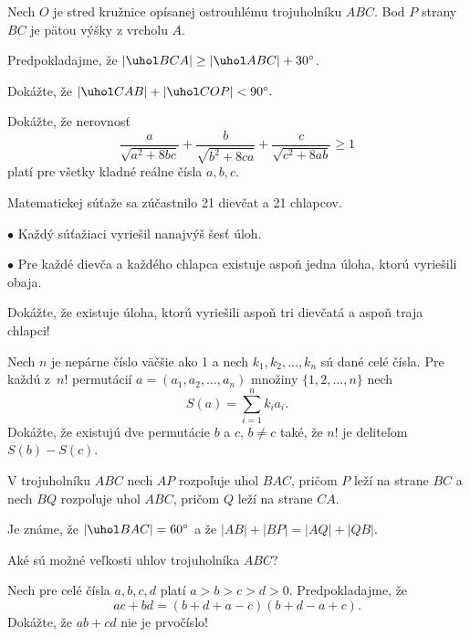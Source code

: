 {%
Nech $O$ je stred  kružnice opísanej ostrouhlému
trojuholníku $ABC$. Bod $P$ strany $BC$ je pätou
výšky z vrcholu $A$.

Predpokladajme, že $|\uhol BCA| \geq
|\uhol ABC| + 30^{\circ}$.

Dokážte, že  $|\uhol CAB| + |\uhol COP| < 90^{\circ}.$}

{%
Dokážte, že nerovnosť
$$
\frac{a}{\sqrt{a^2+8bc}} + \frac{b}{\sqrt{b^2+8ca}} + \frac{c}{\sqrt{c^2+8ab}}
\geq 1
$$
platí pre  všetky  kladné reálne čísla $a,
b, c$.}

{%
Matematickej súťaže sa zúčastnilo 21 dievčat a
21 chlapcov.
\item{$\bullet$}
Každý súťažiaci vyriešil nanajvýš
šesť úloh.
\item{$\bullet$}
Pre každé dievča a každého chlapca existuje
aspoň jedna úloha, ktorú vyriešili obaja.

\noindent
Dokážte, že existuje úloha, ktorú vyriešili
aspoň tri dievčatá a aspoň traja chlapci!}

{%
Nech $n$ je nepárne číslo väčšie ako 1
a nech $k_1, k_2, \dots, k_n$ sú dané celé čísla.
Pre každú z~$n!$ permutácií $a=(a_1, a_2,\dots, a_n)$
množiny $\{1, 2, \dots, n\}$ nech
$$
S(a) = \sum_{i=1}^n k_i a_i.
$$
Dokážte, že existujú dve permutácie $b$ a $c$,
$b \ne c$  také, že $n!$ je deliteľom $S(b)-S(c)$.}

{%
V trojuholníku $ABC$ nech $AP$ rozpoľuje uhol $BAC$,
pričom $P$ leží na strane $BC$ a nech $BQ$
rozpoľuje uhol $ABC$, pričom $Q$ leží na strane
$CA$.

Je známe, že $|\uhol BAC| = 60^{\circ}$ a že
$|AB|+|BP| = |AQ|+|QB|$.

Aké sú možné veľkosti uhlov trojuholníka
$ABC$?}

{%
Nech pre celé čísla $a, b, c, d$ platí
$a>b>c>d>0$. Predpokladajme, že
$$
ac+bd = (b+d+a-c)(b+d-a+c).
$$
Dokážte, že $ab+cd$ nie je prvočíslo!}

